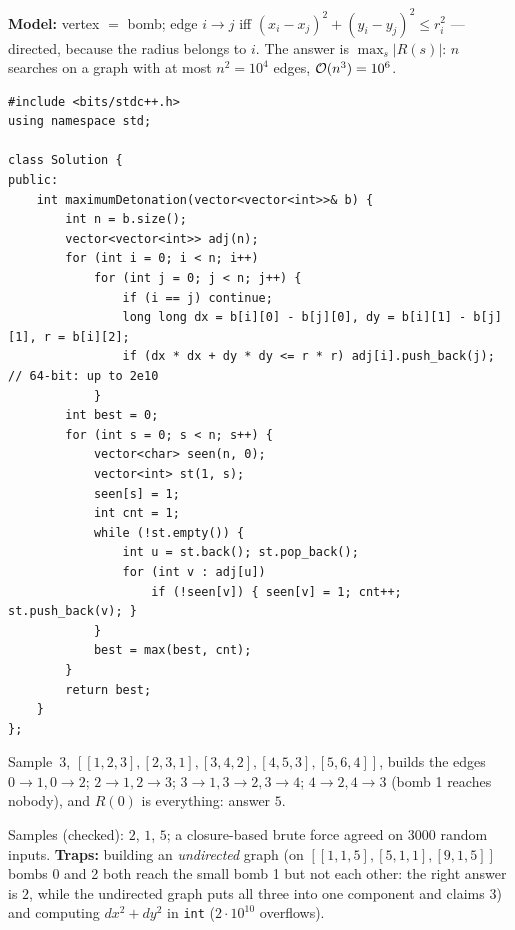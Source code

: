 \begin{solutionbox}
\textbf{Model:} vertex $=$ bomb; edge $i \to j$ iff $(x_i - x_j)^2 + (y_i - y_j)^2 \le r_i^2$ --- directed, because the radius belongs to $i$. The answer is $\max_s |R(s)|$: $n$ searches on a graph with at most $n^2 = 10^4$ edges, $\mathcal{O}(n^3) = 10^6$.
\begin{lstlisting}[style=cpp]
#include <bits/stdc++.h>
using namespace std;

class Solution {
public:
    int maximumDetonation(vector<vector<int>>& b) {
        int n = b.size();
        vector<vector<int>> adj(n);
        for (int i = 0; i < n; i++)
            for (int j = 0; j < n; j++) {
                if (i == j) continue;
                long long dx = b[i][0] - b[j][0], dy = b[i][1] - b[j][1], r = b[i][2];
                if (dx * dx + dy * dy <= r * r) adj[i].push_back(j);   // 64-bit: up to 2e10
            }
        int best = 0;
        for (int s = 0; s < n; s++) {
            vector<char> seen(n, 0);
            vector<int> st(1, s);
            seen[s] = 1;
            int cnt = 1;
            while (!st.empty()) {
                int u = st.back(); st.pop_back();
                for (int v : adj[u])
                    if (!seen[v]) { seen[v] = 1; cnt++; st.push_back(v); }
            }
            best = max(best, cnt);
        }
        return best;
    }
};
\end{lstlisting}
Sample~3, $[[1,2,3],[2,3,1],[3,4,2],[4,5,3],[5,6,4]]$, builds the edges $0{\to}1, 0{\to}2$; $2{\to}1, 2{\to}3$; $3{\to}1, 3{\to}2, 3{\to}4$; $4{\to}2, 4{\to}3$ (bomb 1 reaches nobody), and $R(0)$ is everything: answer $5$.
\begin{center}
\end{center}
Samples (checked): $2$, $1$, $5$; a closure-based brute force agreed on 3000 random inputs. \textbf{Traps:} building an \emph{undirected} graph (on $[[1,1,5],[5,1,1],[9,1,5]]$ bombs 0 and 2 both reach the small bomb 1 but not each other: the right answer is $2$, while the undirected graph puts all three into one component and claims $3$) and computing $dx^2 + dy^2$ in \texttt{int} ($2\cdot 10^{10}$ overflows).
\end{solutionbox}

